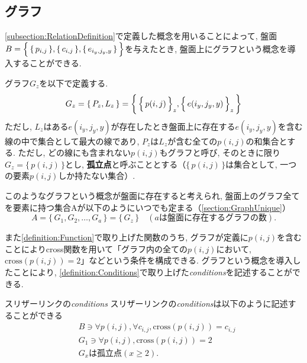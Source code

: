 \subsection{グラフ}\label{subsection:GraphDefinition}
\cref{subsection:RelationDefinition}で定義した概念を用いることによって, 盤面$B=\Bigl\{\,\{\,p_{i,j}\,\},\{\,c_{i,j}\,\},\{\,e_{i_y,j_y,y}\,\}\,\Bigr\}$を与えたとき, 盤面上にグラフという概念を導入することができる.

\begin{definition}[グラフ]\label{definition:GraphDefinition}
  グラフ$G_z$を以下で定義する.
  \begin{equation}
    G_z=\{\,P_z,L_z\,\}=\biggl\{\, \Bigl\{\,p(i,j)\,\Bigr\}_z,\Bigl\{\,e(i_y,j_y,y)\,\Bigr\}_z\,\biggr\}
  \end{equation}
  ただし, $L_z$はある$e(i_y,j_y,y)$が存在したとき盤面上に存在する$e(i_y,j_y,y)$を含む線の中で集合として最大の線であり, $P_z$は$L_z$が含む全ての$p(i,j)$の和集合とする. ただし, どの線にも含まれない$p(i,j)$もグラフと呼び, そのときに限り$G_z=\{\,p(i,j)\,\}$とし, \textbf{孤立点}と呼ぶこととする（$\{\,p(i,j)\,\}$は集合として, 一つの要素$p(i,j)$しか持たない集合）.
\end{definition}

このようなグラフという概念が盤面に存在すると考えられ, 盤面上のグラフ全てを要素に持つ集合Aが以下のようにいつでも定まる（\cref{section:GraphUnique}）
\begin{equation}
  A=\{\,G_1,G_2,\ldots,G_a\,\}=\{\,G_z\,\}\quad (aは盤面に存在するグラフの数)\label{equation:A}.
\end{equation}

また\cref{definition:Function}で取り上げた関数のうち, グラフが定義に$p(i,j)$を含むことによりcross関数を用いて「グラフ内の全ての$p(i,j)$において, $\text{cross}(p(i,j))=2$」などという条件を構成できる. グラフという概念を導入したことにより, \cref{definition:Conditions}で取り上げた\textit{conditions}を記述することができる.
\begin{example}\textup{スリザーリンクの\textit{conditions}}\label{example:SlitherLinkConditions}
  スリザーリンクの\textit{conditions}は以下のように記述することができる
  \begin{align}
     & B\ni \forall p(i,j)   , \forall c_{i,j} , \text{cross}(p(i,j))=c_{i,j}\label{equation:SlitherLinkConditions_1} \\
     & G_1\ni \forall p(i,j)            , \text{cross}(p(i,j))=2             \label{equation:SlitherLinkConditions_2} \\
     & G_xは孤立点(x\ge 2)                                                     \label{equation:SlitherLinkConditions_3}.
  \end{align}
\end{example}

